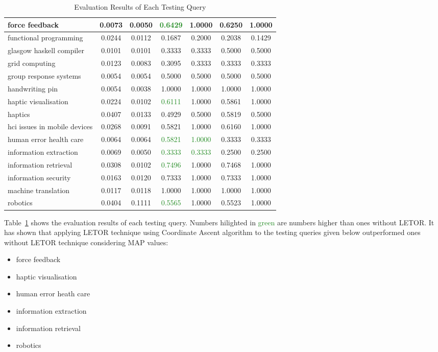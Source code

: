 \begin{table}
\begin{tabular}{|l|c|c|c|c|c|c|}
\hline force feedback & 0.0073 & 0.0050 & \textcolor{ForestGreen}{0.6429} & 1.0000 & 0.6250 & 1.0000 \\
\hline functional programming & 0.0244 & 0.0112 & 0.1687 & 0.2000 & 0.2038 & 0.1429 \\
\hline glasgow haskell compiler & 0.0101 & 0.0101 & 0.3333 & 0.3333 & 0.5000 & 0.5000 \\
\hline grid computing & 0.0123 & 0.0083 & 0.3095 & 0.3333 & 0.3333 & 0.3333 \\
\hline group response systems & 0.0054 & 0.0054 & 0.5000 & 0.5000 & 0.5000 & 0.5000 \\
\hline handwriting pin & 0.0054 & 0.0038 & 1.0000 & 1.0000 & 1.0000 & 1.0000 \\
\hline haptic visualisation & 0.0224 & 0.0102 & \textcolor{ForestGreen}{0.6111} & 1.0000 & 0.5861 & 1.0000 \\
\hline haptics & 0.0407 & 0.0133 & 0.4929 & 0.5000 & 0.5819 & 0.5000 \\
\hline hci issues in mobile devices & 0.0268 & 0.0091 & 0.5821 & 1.0000 & 0.6160 & 1.0000 \\
\hline human error health care & 0.0064 & 0.0064 & \textcolor{ForestGreen}{0.5821} & \textcolor{ForestGreen}{1.0000} & 0.3333 & 0.3333 \\
\hline information extraction & 0.0069 & 0.0050 & \textcolor{ForestGreen}{0.3333} & \textcolor{ForestGreen}{0.3333} & 0.2500 & 0.2500 \\
\hline information retrieval & 0.0308 & 0.0102 & \textcolor{ForestGreen}{0.7496} & 1.0000 & 0.7468 & 1.0000 \\
\hline information security & 0.0163 & 0.0120 & 0.7333 & 1.0000 & 0.7333 & 1.0000 \\
\hline machine translation & 0.0117 & 0.0118 & 1.0000 & 1.0000 & 1.0000 & 1.0000 \\
\hline robotics & 0.0404 & 0.1111 & \textcolor{ForestGreen}{0.5565} & 1.0000 & 0.5523 & 1.0000\\
\hline

\end{tabular}
\caption{Evaluation Results of Each Testing Query} \label{table:eachqueryevaluationresult}
\end{table}

Table~\ref{table:eachqueryevaluationresult} shows the evaluation results of each testing query. Numbers hilighted in \textcolor{ForestGreen}{green}
are numbers higher than ones without LETOR. It has shown that applying LETOR technique using
Coordinate Ascent algorithm to the testing queries given below outperformed ones without LETOR technique considering MAP values:
\begin{itemize}
 \item force feedback
 \item haptic visualisation
 \item human error heath care
 \item information extraction
 \item information retrieval
 \item robotics
\end{itemize}


